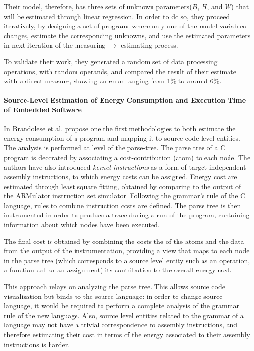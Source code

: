 Their model, therefore, has three sets of unknown parameters($B$, $H$, and $W$) that will be estimated through linear regression. In order to do so, they proceed iteratively, by designing a set of programs where only one of the model variables changes, estimate the corresponding unknowns, and use the estimated parameters in next iteration of the measuring $\rightarrow$ estimating process. \par 
To validate their work, they generated a random set of data processing operations, with random operands, and compared the result of their estimate with a direct measure, showing an error ranging from 1\% to around 6\%. 

\paragraph{Source-Level Estimation of Energy Consumption and Execution Time of Embedded Software}
In \cite{brando2008} Brandolese et al. propose one the first methodologies to both estimate the energy consumption of a program and mapping it to source code level entities. The analysis is performed at level of the parse-tree. The parse tree of a C program is decorated by associating a cost-contribution (atom) to each node. The authors have also introduced \emph{kernel instructions} as a form of target independent assembly instructions, to which energy costs can be assigned. Energy cost are estimated through least square fitting, obtained by comparing to the output of the ARMulator instruction set simulator. Following the grammar's rule of the C language, rules to combine instruction costs are defined. The parse tree is then instrumented in order to produce a trace during a run of the program, containing information about which nodes have been executed. 
\par 
The final cost is obtained by combining the costs the of the atoms and the data from the output of the instrumentation, providing a view that maps to each node in the parse tree (which corresponds to a source level entity such as an operation, a function call or an assignment) its contribution to the overall energy cost. 
\par 
This approach relays on analyzing the parse tree. This allows source code visualization but binds to the source language: in order to change source language, it would be required to perform a complete analysis of the grammar rule of the new language. Also, source level entities related to the grammar of a language may not have a trivial correspondence to assembly instructions, and therefore estimating their cost in terms of the energy associated to their assembly instructions is harder. 


